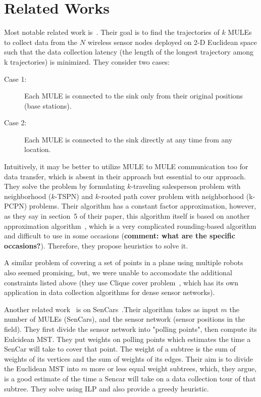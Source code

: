 \chapter{Related Works}
Most notable related work is~\cite{sim}. Their goal is to find the trajectories of $k$ MULEs to collect data from the $N$ wireless sensor nodes deployed on 2-D Euclidean space such that the data collection latency (the length of the longest trajectory among k trajectories) is minimized. They consider two cases: 
\begin{description}
\item[Case 1:] Each MULE is connected to the sink only from their original positions (base stations).
\item[Case 2:] Each MULE is connected to the sink directly at any time from any location.
\end{description}
Intuitively, it may be better to utilize MULE to MULE communication too for data transfer, which is absent in their approach but essential to our approach. They solve the problem by formulating $k$-traveling salesperson problem with neighborhood ($k$-TSPN) and $k$-rooted path cover problem with neighborhood (k-PCPN) problems. Their algorithm has a constant factor approximation, however, as they say in section~5 of their paper, this algorithm itself is based on another approximation algorithm~\cite{supportSim}, which is a very complicated rounding-based algorithm and difficult to use in some occasions ({\bf comment: what are the specific occasions?}). Therefore, they propose heuristics to solve it.

A similar problem of covering a set of points in a plane using multiple robots~\cite{roboPlan} also seemed promising, but, we were unable to accomodate the additional constraints listed above (they use Clique cover problem~\cite{minCliquePartition}, which has its own application in data collection algorithms for dense sensor networks).

Another related work~\cite{sim4} is on SenCars~\cite{sencar}.Their algorithm takes as input $m$ the number of MULEs (SenCars), and the sensor network (sensor positions in the field). They first divide the sensor network into "polling points", then compute its Eulcidean MST. They put weights on polling points which estimates the time a SenCar will take to cover that point. The weight of a subtree is the sum of weights of its vertices and the sum of weights of its edges. Their aim is to divide the Euclidean MST into $m$ more or less equal weight subtrees, which, they argue, is a good estimate of the time a Sencar will take on a data collection tour of that subtree. They solve using ILP and also provide a greedy heuristic.

